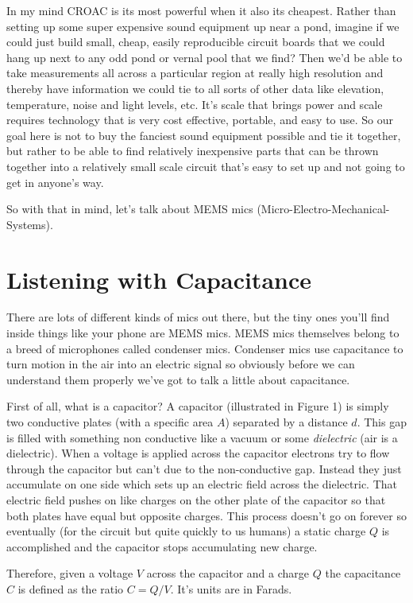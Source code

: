 \documentclass[10pt,a5paper]{book}
\begin{document}
In my mind CROAC is its most powerful when it also its cheapest. Rather than setting up some super expensive sound equipment up near a pond, imagine if we could just build small, cheap, easily reproducible circuit boards that we could hang up next to any odd pond or vernal pool that we find? Then we'd be able to take measurements all across a particular region at really high resolution and thereby have information we could tie to all sorts of other data like elevation, temperature, noise and light levels, etc. It's scale that brings power and scale requires technology that is very cost effective, portable, and easy to use. So our goal here is not to buy the fanciest sound equipment possible and tie it together, but rather to be able to find relatively inexpensive parts that can be thrown together into a relatively small scale circuit that's easy to set up and not going to get in anyone's way. 

So with that in mind, let's talk about MEMS mics (Micro-Electro-Mechanical-Systems).
\section{Listening with Capacitance}
There are lots of different kinds of mics out there, but the tiny ones you'll find inside things like your phone are MEMS mics. MEMS mics themselves belong to a breed of microphones called condenser mics. Condenser mics use capacitance to turn motion in the air into an electric signal so obviously before we can understand them properly we've got to talk a little about capacitance. 

First of all, what is a capacitor? A capacitor (illustrated in Figure 1) is simply two conductive plates (with a specific area $A$) separated by a distance $d$. This gap is filled with something non conductive like a vacuum or some \textit{dielectric} (air is a dielectric). When a voltage is applied across the capacitor electrons try to flow through the capacitor but can't due to the non-conductive gap. Instead they just accumulate on one side which sets up an electric field across the dielectric. That electric field pushes on like charges on the other plate of the capacitor so that both plates have equal but opposite charges. This process doesn't go on forever so eventually (for the circuit but quite quickly to us humans) a static charge $Q$ is accomplished and the capacitor stops accumulating new charge. 

Therefore, given a voltage $V$ across the capacitor and a charge $Q$ the capacitance $C$ is defined as the ratio $C=Q/V$. It's units are in Farads. 
\end{document}
